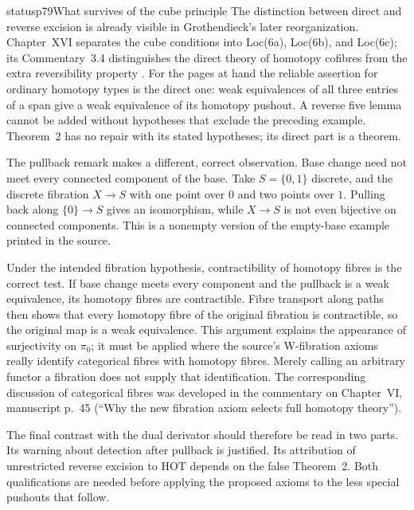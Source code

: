 \begin{dcomment}{status}{p79}{What survives of the cube principle}
The distinction between direct and reverse excision is already visible in Grothendieck's later reorganization. Chapter~XVI separates the cube conditions into Loc(6a), Loc(6b), and Loc(6c); its Commentary~3.4 distinguishes the direct theory of homotopy cofibres from the extra reversibility property \citep[\S3, manuscript pp.~16--27]{GrothendieckDerivateursXVI}. For the pages at hand the reliable assertion for ordinary homotopy types is the direct one: weak equivalences of all three entries of a span give a weak equivalence of its homotopy pushout. A reverse five lemma cannot be added without hypotheses that exclude the preceding example. Theorem~2 has no repair with its stated hypotheses; its direct part is a theorem.

The pullback remark makes a different, correct observation. Base change need not meet every connected component of the base. Take $S=\{0,1\}$ discrete, and the discrete fibration $X\to S$ with one point over $0$ and two points over $1$. Pulling back along $\{0\}\to S$ gives an isomorphism, while $X\to S$ is not even bijective on connected components. This is a nonempty version of the empty-base example printed in the source.

Under the intended fibration hypothesis, contractibility of homotopy fibres is the correct test. If base change meets every component and the pullback is a weak equivalence, its homotopy fibres are contractible. Fibre transport along paths then shows that every homotopy fibre of the original fibration is contractible, so the original map is a weak equivalence. This argument explains the appearance of surjectivity on $\pi_0$; it must be applied where the source's W-fibration axioms really identify categorical fibres with homotopy fibres. Merely calling an arbitrary functor a fibration does not supply that identification. The corresponding discussion of categorical fibres was developed in the commentary on Chapter~VI, manuscript p.~45 (``Why the new fibration axiom selects full homotopy theory'').

The final contrast with the dual derivator should therefore be read in two parts. Its warning about detection after pullback is justified. Its attribution of unrestricted reverse excision to $\mathrm{HOT}$ depends on the false Theorem~2. Both qualifications are needed before applying the proposed axioms to the less special pushouts that follow.
\end{dcomment}

